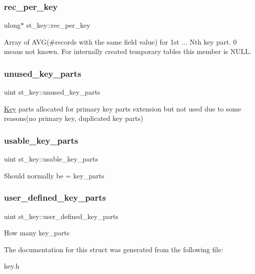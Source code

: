 \subsubsection{\texorpdfstring{rec\+\_\+per\+\_\+key}{rec\_per\_key}}
{\footnotesize\ttfamily ulong$\ast$ st\+\_\+key\+::rec\+\_\+per\+\_\+key}

Array of A\+VG(\#records with the same field value) for 1st ... Nth key part. 0 means \textquotesingle{}not known\textquotesingle{}. For internally created temporary tables this member is N\+U\+LL. \mbox{\label{structst__key_a752659925a2775974f1e6c7c558c1cbc}} 
\subsubsection{\texorpdfstring{unused\+\_\+key\+\_\+parts}{unused\_key\_parts}}
{\footnotesize\ttfamily uint st\+\_\+key\+::unused\+\_\+key\+\_\+parts}

\mbox{\hyperlink{classKey}{Key}} parts allocated for primary key parts extension but not used due to some reasons(no primary key, duplicated key parts) \mbox{\label{structst__key_ac733c94b20da4e1547c0845b482d4a7a}} 
\subsubsection{\texorpdfstring{usable\+\_\+key\+\_\+parts}{usable\_key\_parts}}
{\footnotesize\ttfamily uint st\+\_\+key\+::usable\+\_\+key\+\_\+parts}

Should normally be = key\+\_\+parts \mbox{\label{structst__key_abd3126670f8060d4d3c29a1637836ac3}} 
\subsubsection{\texorpdfstring{user\+\_\+defined\+\_\+key\+\_\+parts}{user\_defined\_key\_parts}}
{\footnotesize\ttfamily uint st\+\_\+key\+::user\+\_\+defined\+\_\+key\+\_\+parts}

How many key\+\_\+parts 

The documentation for this struct was generated from the following file\+:\begin{DoxyCompactItemize}
\item 
key.\+h\end{DoxyCompactItemize}
